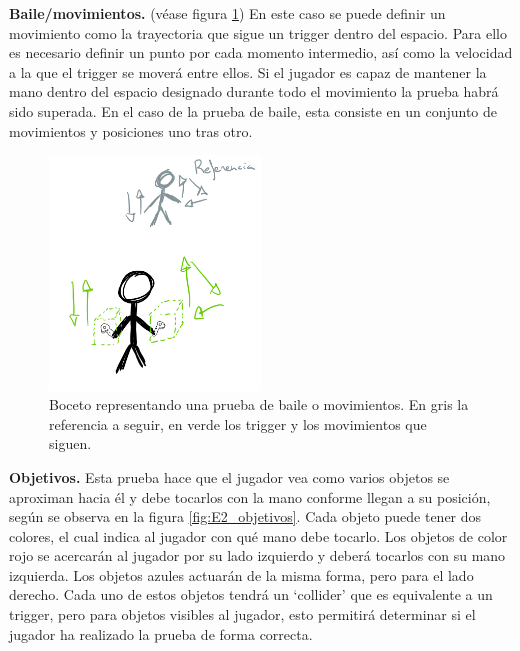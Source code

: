 \textbf{Baile/movimientos.} (véase figura \ref{fig:E2_baile}) En este caso se puede definir un movimiento como la trayectoria que sigue un trigger dentro del espacio. Para ello es necesario definir un punto por cada momento intermedio, así como la velocidad a la que el trigger se moverá entre ellos. Si el jugador es capaz de mantener la mano dentro del espacio designado durante todo el movimiento la prueba habrá sido superada. En el caso de la prueba de baile, esta consiste en un conjunto de movimientos y posiciones uno tras otro.

\begin{figure}
  \centering
    \includegraphics[width=0.5\textwidth]{04.Desarrollo/02.Entrega2/01.Iteracion2_1/00.Figuras/04.baile.png}
    \caption{Boceto representando una prueba de baile o movimientos. En gris la referencia a seguir, en verde los trigger y los movimientos que siguen.}
    \label{fig:E2_baile}
\end{figure}


\textbf{Objetivos.} Esta prueba hace que el jugador vea como varios objetos se aproximan hacia él y debe tocarlos con la mano conforme llegan a su posición, según se observa en la figura \ref{fig:E2_objetivos}. Cada objeto puede tener dos colores, el cual indica al jugador con qué mano debe tocarlo. Los objetos de color rojo se acercarán al jugador por su lado izquierdo y deberá tocarlos con su mano izquierda. Los objetos azules actuarán de la misma forma, pero para el lado derecho. Cada uno de estos objetos tendrá un ‘collider’ que es equivalente a un trigger, pero para objetos visibles al jugador, esto permitirá determinar si el jugador ha realizado la prueba de forma correcta.


